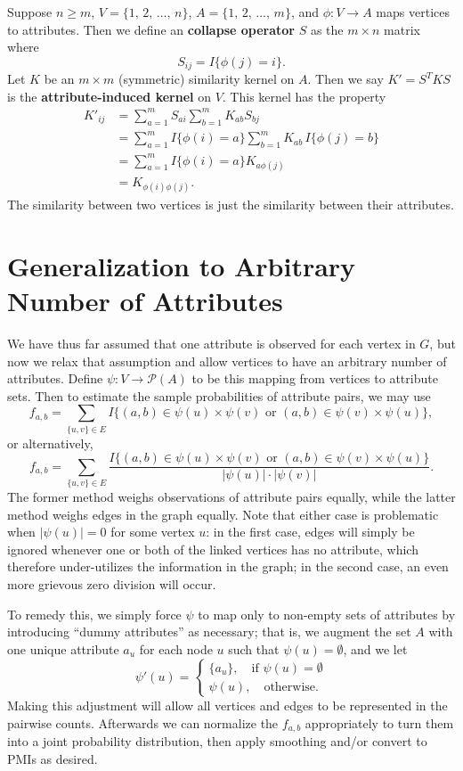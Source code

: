 \documentclass[11pt, oneside, fleqn]{article}   	%
\theoremstyle{plain}
\newcommand{\powerset}{\mathcal{P}}
\begin{document}
Suppose $n \geq m$, $V = \{1, \, 2, \, \ldots, \, n\}$, $A = \{1, \, 2, \, \ldots, \, m\}$, and $\phi : V \rightarrow A$ maps vertices to attributes.  Then we define an \textbf{collapse operator} $S$ as the $m \times n$ matrix where
$$ S_{ij} = I \{\phi(j) = i\}. $$
Let $K$ be an $m \times m$ (symmetric) similarity kernel on $A$.  Then we say $K' = S^T K S$ is the \textbf{attribute-induced kernel} on $V$.  This kernel has the property
\begin{align*}
K'_{ij} & = \sum_{a=1}^m S_{ai} \sum_{b=1}^m K_{ab} S_{bj} \\
& = \sum_{a=1}^m I\{\phi(i) = a\} \sum_{b=1}^m K_{ab} \, I\{\phi(j) = b\} \\
& = \sum_{a=1}^m I\{\phi(i) = a\} K_{a \phi(j)} \\
& = K_{\phi(i) \phi(j)}.
\end{align*}
The similarity between two vertices is just the similarity between their attributes.  

\section{Generalization to Arbitrary Number of Attributes}
We have thus far assumed that one attribute is observed for each vertex in $G$, but now we relax that assumption and allow vertices to have an arbitrary number of attributes.  Define $\psi : V \rightarrow \powerset(A)$ to be this mapping from vertices to attribute sets.  Then to estimate the sample probabilities of attribute pairs, we may use
$$ f_{a,b} = \displaystyle \sum_{\{u, v\} \in E} I\{(a, b) \in \psi(u) \times \psi(v) \text{ or } (a, b) \in \psi(v) \times \psi(u)\}, $$
or alternatively,
$$ f_{a,b} = \displaystyle \sum_{\{u, v\} \in E} \frac{I\{(a, b) \in \psi(u) \times \psi(v) \text{ or } (a, b) \in \psi(v) \times \psi(u)\}}{|\psi(u)| \cdot |\psi(v)|}. $$
The former method weighs observations of attribute pairs equally, while the latter method weighs edges in the graph equally.  Note that either case is problematic when $|\psi(u)| = 0$ for some vertex $u$: in the first case, edges will simply be ignored whenever one or both of the linked vertices has no attribute, which therefore under-utilizes the information in the graph; in the second case, an even more grievous zero division will occur.

To remedy this, we simply force $\psi$ to map only to non-empty sets of attributes by introducing ``dummy attributes'' as necessary; that is, we augment the set $A$ with one unique attribute $a_u$ for each node $u$ such that $\psi(u) = \emptyset$, and we let 
$$ \psi'(u) = \begin{cases} \{a_u\}, \quad \text{if } \psi(u) = \emptyset \\ \psi(u), \quad \text{otherwise.} \end{cases} $$
Making this adjustment will allow all vertices and edges to be represented in the pairwise counts.  Afterwards we can normalize the $f_{a,b}$ appropriately to turn them into a joint probability distribution, then apply smoothing and/or convert to PMIs as desired.
\end{document}
